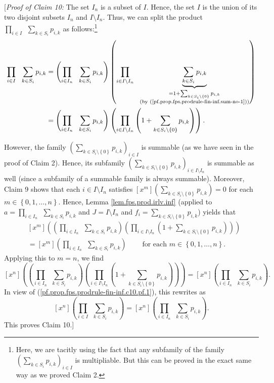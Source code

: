 [\textit{Proof of Claim 10:} The set $I_{n}$ is a subset of $I$. Hence, the
set $I$ is the union of its two disjoint subsets $I_{n}$ and $I\setminus
I_{n}$. Thus, we can split the product $\prod_{i\in I}\ \ \sum_{k\in S_{i}%
}p_{i,k}$ as follows:\footnote{Here, we are tacitly using the fact that any
subfamily of the family $\left(  \sum_{k\in S_{i}}p_{i,k}\right)  _{i\in I}$
is multipliable. But this can be proved in the exact same way as we proved
Claim 2.}%
\begin{align}
\prod_{i\in I}\ \ \sum_{k\in S_{i}}p_{i,k}  &  =\left(  \prod_{i\in I_{n}%
}\ \ \sum_{k\in S_{i}}p_{i,k}\right)  \left(  \prod_{i\in I\setminus I_{n}%
}\ \ \underbrace{\sum_{k\in S_{i}}p_{i,k}}_{\substack{=1+\sum_{k\in
S_{i}\setminus\left\{  0\right\}  }p_{i,k}\\\text{(by
(\ref{pf.prop.fps.prodrule-fin-inf.sum-no-1}))}}}\right) \nonumber\\
&  =\left(  \prod_{i\in I_{n}}\ \ \sum_{k\in S_{i}}p_{i,k}\right)  \left(
\prod_{i\in I\setminus I_{n}}\left(  1+\sum_{k\in S_{i}\setminus\left\{
0\right\}  }p_{i,k}\right)  \right)  .
\label{pf.prop.fps.prodrule-fin-inf.c10.pf.1}%
\end{align}


However, the family $\left(  \sum_{k\in S_{i}\setminus\left\{  0\right\}
}p_{i,k}\right)  _{i\in I}$ is summable (as we have seen in the proof of Claim
2). Hence, its subfamily $\left(  \sum_{k\in S_{i}\setminus\left\{  0\right\}
}p_{i,k}\right)  _{i\in I\setminus I_{n}}$ is summable as well (since a
subfamily of a summable family is always summable). Moreover, Claim 9 shows
that each $i\in I\setminus I_{n}$ satisfies $\left[  x^{m}\right]  \left(
\sum_{k\in S_{i}\setminus\left\{  0\right\}  }p_{i,k}\right)  =0$ for each
$m\in\left\{  0,1,\ldots,n\right\}  $. Hence, Lemma
\ref{lem.fps.prod.irlv.inf} (applied to $a=\prod_{i\in I_{n}}\ \ \sum_{k\in
S_{i}}p_{i,k}$ and $J=I\setminus I_{n}$ and $f_{i}=\sum_{k\in S_{i}%
\setminus\left\{  0\right\}  }p_{i,k}$) yields that%
\begin{align*}
&  \left[  x^{m}\right]  \left(  \left(  \prod_{i\in I_{n}}\ \ \sum_{k\in
S_{i}}p_{i,k}\right)  \left(  \prod_{i\in I\setminus I_{n}}\left(
1+\sum_{k\in S_{i}\setminus\left\{  0\right\}  }p_{i,k}\right)  \right)
\right) \\
&  =\left[  x^{m}\right]  \left(  \prod_{i\in I_{n}}\ \ \sum_{k\in S_{i}%
}p_{i,k}\right)  \ \ \ \ \ \ \ \ \ \ \text{for each }m\in\left\{
0,1,\ldots,n\right\}  .
\end{align*}
Applying this to $m=n$, we find%
\[
\left[  x^{n}\right]  \left(  \left(  \prod_{i\in I_{n}}\ \ \sum_{k\in S_{i}%
}p_{i,k}\right)  \left(  \prod_{i\in I\setminus I_{n}}\left(  1+\sum_{k\in
S_{i}\setminus\left\{  0\right\}  }p_{i,k}\right)  \right)  \right)  =\left[
x^{n}\right]  \left(  \prod_{i\in I_{n}}\ \ \sum_{k\in S_{i}}p_{i,k}\right)
.
\]
In view of (\ref{pf.prop.fps.prodrule-fin-inf.c10.pf.1}), this rewrites as%
\[
\left[  x^{n}\right]  \left(  \prod_{i\in I}\ \ \sum_{k\in S_{i}}%
p_{i,k}\right)  =\left[  x^{n}\right]  \left(  \prod_{i\in I_{n}}%
\ \ \sum_{k\in S_{i}}p_{i,k}\right)  .
\]
This proves Claim 10.]

